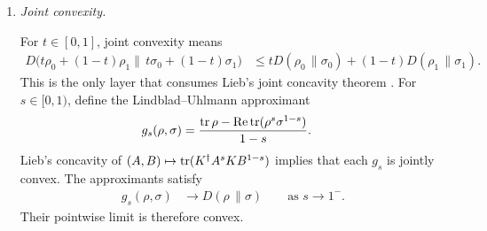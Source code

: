 \documentclass[11pt]{article}
\begin{document}
\begin{enumerate}
    For the singular case, the reference density operator is regularized as
    \begin{align}
        \sigma'_\varepsilon
            &= \frac{\sigma+\varepsilon\Id}{1+\varepsilon N},
        \qquad \varepsilon>0,
        \label{eq:cpsv16_ssa_from_lieb_route_reference_regularization}
    \end{align}
    where $N$ is the matrix dimension. The matrix
    $\sigma'_\varepsilon$ is positive definite and has the same eigenvectors
    as $\sigma$. As $\varepsilon\to0^+$, the matrix limit reduces to scalar
    logarithm limits on the positive eigenvalues. The condition
    $\ker\sigma\subseteq\ker\rho$ eliminates the diagonal weights associated
    with zero eigenvalues. The formal limit is
    . This proof uses neither Lieb
    concavity nor operator Jensen.

    The full-rank equality case is
    . If the relative entropy
    vanishes, every term in the Gibbs slack is tight. The strict inequality
    $\log x<x-1$ for $x\neq1$ forces the eigenvalues to agree on the overlap
    support. The resulting relation makes the overlap matrix intertwine the
    eigenvalue diagonals, and conjugating $\sigma$ into the eigenbasis of
    $\rho$ gives $\rho=\sigma$. This argument also uses neither Lieb concavity
    nor operator Jensen.

    \item \emph{Joint convexity.}

    For $t\in[0,1]$, joint convexity means
    \begin{align}
        D\bigl(t\rho_0+(1-t)\rho_1
          \|\,t\sigma_0+(1-t)\sigma_1\bigr)
        &\leq tD(\rho_0\,\| \sigma_0)
          +(1-t)D(\rho_1\,\| \sigma_1).
        \label{eq:cpsv16_ssa_from_lieb_route_joint_convexity}
    \end{align}
    This is the only layer that consumes Lieb's joint concavity theorem
    \cite{Lieb1973Convex}. For $s\in[0,1)$, define the Lindblad--Uhlmann
    approximant
    \begin{align}
        g_s(\rho,\sigma)
            &= \frac{\operatorname{tr}\rho
              -\operatorname{Re}\operatorname{tr}(\rho^s\sigma^{1-s})}{1-s}.
        \label{eq:cpsv16_ssa_from_lieb_route_relative_entropy_approximant}
    \end{align}
    Lieb's concavity of
    $(A,B)\mapsto\operatorname{tr}(K^\dagger A^sKB^{1-s})$ implies that each $g_s$ is jointly
    convex. The approximants satisfy
    \begin{align}
        g_s(\rho,\sigma)
            &\longrightarrow D(\rho\,\| \sigma)
            \qquad\text{as }s\to1^-.
        \label{eq:cpsv16_ssa_from_lieb_route_approximant_limit}
    \end{align}
    Their pointwise limit is therefore convex.


\end{enumerate}
\end{document}
